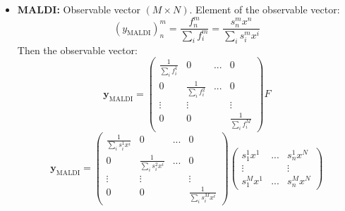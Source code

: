 \documentclass[10pt,A4paper]{article}
\begin{document}
\begin{itemize}
    \item \textbf{MALDI:}  Observable vector $(M \times N)$.
    Element of the observable vector:
    \begin{equation}
        (y_\text{MALDI})^m_n = \frac{f^m_n}{\sum_i f^m_i} = \frac{s^m_n  x^n}{\sum_i s^m_i  x^i}
    \end{equation}
    Then the observable vector:
    \begin{equation}
        \mathbf{y}_\text{MALDI} = \begin{pmatrix}
            \frac{1}{\sum_i f_i^1} & 0                      & ... & 0           \\
            0                      & \frac{1}{\sum_i f_i^2} & ... & 0           \\
            \vdots                 & \vdots                 &     & \vdots      \\
            0                      & 0                      &     & \frac{1}{\sum_i f_i^M}
        \end{pmatrix} F
        \end{equation}
        \begin{equation}
            \boxed{\mathbf{y}_\text{MALDI} = \begin{pmatrix}
                \frac{1}{\sum_i s_i^1 x^i} & 0                           & ... & 0 \\
                0                          & \frac{1}{\sum_i s_i^2  x^i} & ... & 0 \\
                \vdots                     & \vdots                      &     &\vdots \\
                0                          & 0                           &     &\frac{1}{\sum_i s_i^M  x^i}
        \end{pmatrix} 
        \begin{pmatrix}
            s_1^1 x^1 & ... & s_n^1 x^N \\
            \vdots    &     & \vdots    \\
            s_1^M x^1 & ... & s_n^M x^N 
        \end{pmatrix}} 
    \end{equation}
\end{itemize}
\end{document}
